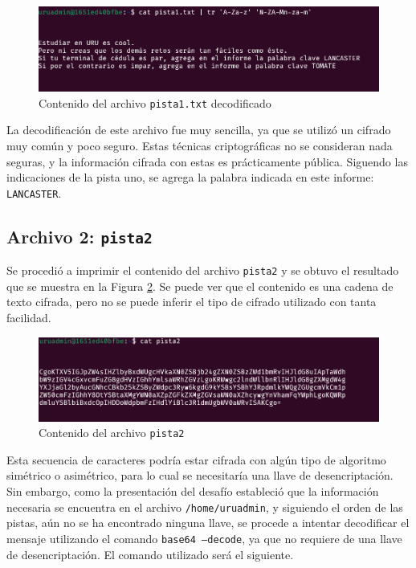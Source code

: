 \documentclass{article}
\begin{document}
\begin{figure}[ht!]
  \includegraphics[width=\textwidth]{pista1_decoded.png}
  \caption{Contenido del archivo \texttt{pista1.txt} decodificado}
  \label{fig:pista1_decoded}
\end{figure}

La decodificación de este archivo fue muy sencilla, ya que se utilizó un cifrado muy común y poco seguro. Estas técnicas criptográficas no se consideran nada seguras, y la información cifrada con estas es prácticamente pública. Siguendo las indicaciones de la pista uno, se agrega la palabra indicada en este informe: \texttt{LANCASTER}.

\subsection{Archivo 2: \texttt{pista2}}

Se procedió a imprimir el contenido del archivo \texttt{pista2} y se obtuvo el resultado que se muestra en la Figura \ref{fig:pista2}. Se puede ver que el contenido es una cadena de texto cifrada, pero no se puede inferir el tipo de cifrado utilizado con tanta facilidad.

\begin{figure}[ht!]
  \includegraphics[width=\textwidth]{pista2.png}
  \caption{Contenido del archivo \texttt{pista2}}
  \label{fig:pista2}
\end{figure}

Esta secuencia de caracteres podría estar cifrada con algún tipo de algoritmo simétrico o asimétrico, para lo cual se necesitaría una llave de desencriptación. Sin embargo, como la presentación del desafío estableció que la información necesaria se encuentra en el archivo \texttt{/home/uruadmin}, y siguiendo el orden de las pistas, aún no se ha encontrado ninguna llave, se procede a intentar decodificar el mensaje utilizando el comando \texttt{base64 --decode}, ya que no requiere de una llave de desencriptación. El comando utilizado será el siguiente.
\end{document}
